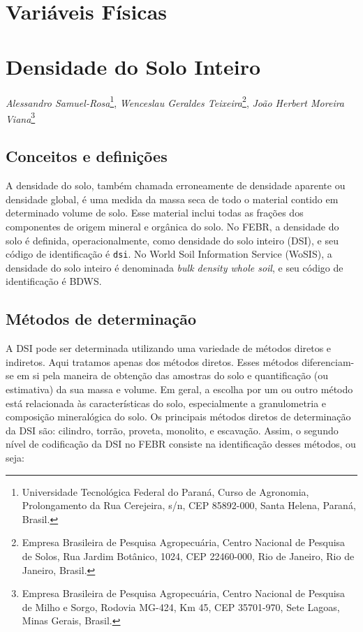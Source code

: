 \documentclass[
]{book}
\begin{document}
\hypertarget{variuxe1veis-fuxedsicas}{%
\chapter*{Variáveis Físicas}\label{variuxe1veis-fuxedsicas}}

\hypertarget{densidade-do-solo-inteiro}{%
\chapter{Densidade do Solo Inteiro}\label{densidade-do-solo-inteiro}}

\emph{Alessandro Samuel-Rosa}\footnote{Universidade Tecnológica Federal do Paraná, Curso de Agronomia, Prolongamento da Rua Cerejeira, s/n, CEP 85892-000, Santa Helena, Paraná, Brasil.}, \emph{Wenceslau Geraldes Teixeira}\footnote{Empresa Brasileira de Pesquisa Agropecuária, Centro Nacional de Pesquisa de Solos, Rua Jardim Botânico, 1024, CEP 22460-000, Rio de Janeiro, Rio de Janeiro, Brasil.}, \emph{João Herbert Moreira Viana}\footnote{Empresa Brasileira de Pesquisa Agropecuária, Centro Nacional de Pesquisa de Milho e Sorgo, Rodovia MG-424, Km 45, CEP 35701-970, Sete Lagoas, Minas Gerais, Brasil.}

\hypertarget{conceitos-e-definiuxe7uxf5es-1}{%
\section{Conceitos e definições}\label{conceitos-e-definiuxe7uxf5es-1}}

A densidade do solo, também chamada erroneamente de densidade aparente ou densidade global, é uma medida da massa seca de todo o material contido em determinado volume de solo. Esse material inclui todas as frações dos componentes de origem mineral e orgânica do solo. No FEBR, a densidade do solo é definida, operacionalmente, como densidade do solo inteiro (DSI), e seu código de identificação é \texttt{dsi}. No World Soil Information Service (WoSIS), a densidade do solo inteiro é denominada \emph{bulk density whole soil}, e seu código de identificação é BDWS.

\hypertarget{muxe9todos-de-determinauxe7uxe3o-1}{%
\section{Métodos de determinação}\label{muxe9todos-de-determinauxe7uxe3o-1}}

A DSI pode ser determinada utilizando uma variedade de métodos diretos e indiretos. Aqui tratamos apenas dos métodos diretos. Esses métodos diferenciam-se em si pela maneira de obtenção das amostras do solo e quantificação (ou estimativa) da sua massa e volume. Em geral, a escolha por um ou outro método está relacionada às características do solo, especialmente a granulometria e composição mineralógica do solo. Os principais métodos diretos de determinação da DSI são: cilindro, torrão, proveta, monolito, e escavação. Assim, o segundo nível de codificação da DSI no FEBR consiste na identificação desses métodos, ou seja:
\end{document}
